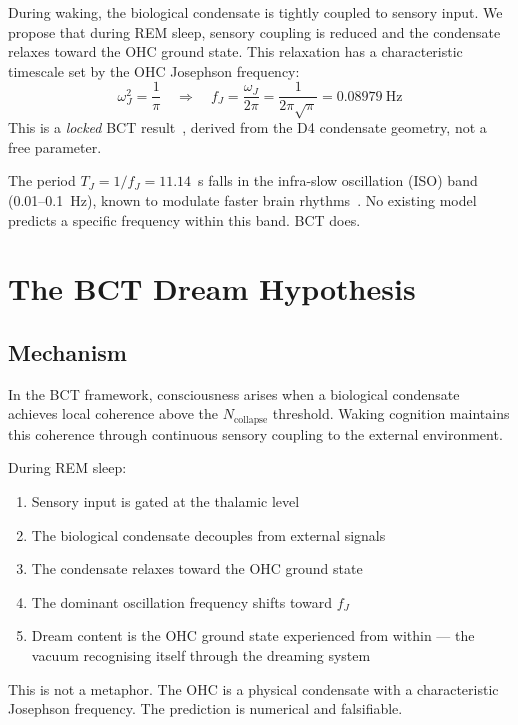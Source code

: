 \documentclass[aps,prl,twocolumn,showpacs,preprintnumbers]{revtex4-2}
\newcommand{\fJ}{f_J}
\newcommand{\omJ}{\omega_J}
\newcommand{\Ncol}{N_{\mathrm{collapse}}}
\begin{document}
During waking, the biological condensate is tightly coupled to
sensory input. We propose that during REM sleep, sensory coupling
is reduced and the condensate relaxes toward the OHC ground state.
This relaxation has a characteristic timescale set by the OHC
Josephson frequency:
\begin{equation}
\omJ^2 = \frac{1}{\pi}
\quad\Rightarrow\quad
\fJ = \frac{\omJ}{2\pi} = \frac{1}{2\pi\sqrt{\pi}}
= 0.08979~\mathrm{Hz}
\label{eq:fJ}
\end{equation}
This is a \emph{locked} BCT result~\cite{master}, derived from
the D4 condensate geometry, not a free parameter.

The period $T_J = 1/\fJ = 11.14$~s falls in the infra-slow
oscillation (ISO) band (0.01--0.1~Hz), known to modulate faster
brain rhythms~\cite{iso}. No existing model predicts a specific
frequency within this band. BCT does.

\section{The BCT Dream Hypothesis}

\subsection{Mechanism}

In the BCT framework, consciousness arises when a biological
condensate achieves local coherence above the $\Ncol$ threshold.
Waking cognition maintains this coherence through continuous
sensory coupling to the external environment.

During REM sleep:
\begin{enumerate}
\item Sensory input is gated at the thalamic level
\item The biological condensate decouples from external signals
\item The condensate relaxes toward the OHC ground state
\item The dominant oscillation frequency shifts toward $\fJ$
\item Dream content is the OHC ground state experienced from
      within — the vacuum recognising itself through the
      dreaming system
\end{enumerate}

This is not a metaphor. The OHC is a physical condensate with a
characteristic Josephson frequency. The prediction is numerical
and falsifiable.
\end{document}
